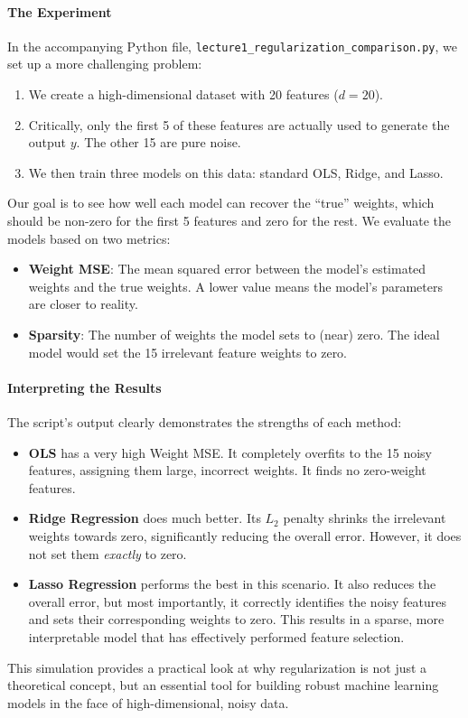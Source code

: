 \documentclass{article}
\begin{document}
\paragraph{The Experiment}
In the accompanying Python file, \texttt{lecture1\_regularization\_comparison.py}, we set up a more challenging problem:
\begin{enumerate}
    \item We create a high-dimensional dataset with 20 features ($d=20$).
    \item Critically, only the first 5 of these features are actually used to generate the output $y$. The other 15 are pure noise.
    \item We then train three models on this data: standard OLS, Ridge, and Lasso.
\end{enumerate}
Our goal is to see how well each model can recover the ``true'' weights, which should be non-zero for the first 5 features and zero for the rest. We evaluate the models based on two metrics:
\begin{itemize}
    \item \textbf{Weight MSE}: The mean squared error between the model's estimated weights and the true weights. A lower value means the model's parameters are closer to reality.
    \item \textbf{Sparsity}: The number of weights the model sets to (near) zero. The ideal model would set the 15 irrelevant feature weights to zero.
\end{itemize}

\paragraph{Interpreting the Results}
The script's output clearly demonstrates the strengths of each method:
\begin{itemize}
    \item \textbf{OLS} has a very high Weight MSE. It completely overfits to the 15 noisy features, assigning them large, incorrect weights. It finds no zero-weight features.
    \item \textbf{Ridge Regression} does much better. Its $L_2$ penalty shrinks the irrelevant weights towards zero, significantly reducing the overall error. However, it does not set them \textit{exactly} to zero.
    \item \textbf{Lasso Regression} performs the best in this scenario. It also reduces the overall error, but most importantly, it correctly identifies the noisy features and sets their corresponding weights to zero. This results in a sparse, more interpretable model that has effectively performed feature selection.
\end{itemize}
This simulation provides a practical look at why regularization is not just a theoretical concept, but an essential tool for building robust machine learning models in the face of high-dimensional, noisy data.
\end{document}
